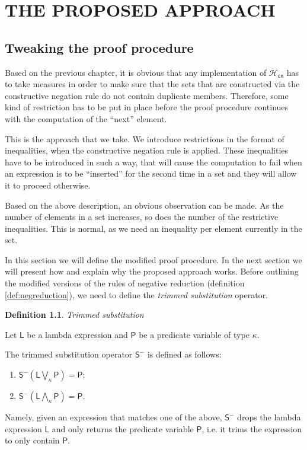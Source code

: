 \documentclass[inscr,ack,preface]{dithesis}
\theoremstyle{definition}
\newtheorem{definition}{Definition}[]
\newcommand{\hcn}{$\mathcal{H}_\mathsf{cn}$}
\newcommand{\msf}[1]{$\mathsf{#1}$}
\begin{document}
\chapter{THE PROPOSED APPROACH}
\label{chap:approach}

\section{Tweaking the proof procedure}
Based on the previous chapter, it is obvious that any implementation of \hcn{} has to take measures in order to make sure that the sets that are constructed via the constructive negation rule do not contain duplicate members. Therefore, some kind of restriction has to be put in place before the proof procedure continues with the computation of the ``next'' element.

This is the approach that we take. We introduce restrictions in the format of inequalities, when the constructive negation rule is applied. These inequalities have to be introduced in such a way, that will cause the computation to fail when an expression is to be ``inserted'' for the second time in a set and they will allow it to proceed otherwise.

Based on the above description, an obvious observation can be made. As the number of elements in a set increases, so does the number of the restrictive inequalities. This is normal, as we need an inequality per element currently in the set.

In this section we will define the modified proof procedure. In the next section we will present how and explain why the proposed approach works. Before outlining the modified versions of the rules of negative reduction (definition \ref{def:negreduction}), we need to define the \emph{trimmed substitution} operator.

\begin{definition}{\emph{Trimmed substitution}}

Let \msf{L} be a lambda expression and \msf{P} be a predicate variable of type $\kappa$.

The trimmed substitution operator \msf{S^{-}} is defined as follows:
\begin{enumerate}
  \item \msf{S^{-}\left( L \bigvee_{\kappa} P \right) = P };
  \item \msf{S^{-}\left( L \bigwedge_{\kappa} P \right) = P }.
\end{enumerate}

Namely, given an expression that matches one of the above, \msf{S^{-}} drops the lambda expression \msf{L} and only returns the predicate variable \msf{P}, i.e. it trims the expression to only contain \msf{P}.
\end{definition}
\end{document}
